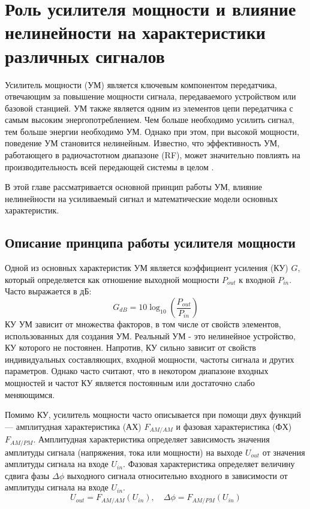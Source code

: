 \section{Роль усилителя мощности и влияние нелинейности
на характеристики различных сигналов}
Усилитель мощности (УМ) является ключевым компонентом передатчика,
отвечающим за повышение мощности сигнала, передаваемого устройством или
базовой станцией. УМ также является одним из элементов цепи передатчика с
самым высоким энергопотреблением. Чем больше необходимо усилить сигнал, тем
больше энергии необходимо УМ. Однако при этом, при высокой мощности,
поведение УМ становится нелинейным. Известно, что эффективность УМ,
работающего в радиочастотном диапазоне (RF), может значительно повлиять на
производительность всей передающей системы
в целом \cite{Lie2018}.

В этой главе рассматривается основной принцип работы УМ, влияние
нелинейности на усиливаемый сигнал и математические модели основных
характеристик.


\subsection{Описание принципа работы усилителя мощности}
Одной из основных характеристик УМ является коэффициент усиления (КУ) $G$,
который определяется как отношение выходной мощности $P_{out}$ к входной
$P_{in}$. Часто выражается в дБ:
\begin{equation}
    G_{dB} = 10\log_{10}\left(\frac{P_{out}}{P_{in}}\right)
\end{equation}
КУ УМ зависит от множества факторов, в том числе от свойств элементов,
использованных для создания УМ. Реальный УМ - это нелинейное устройство, КУ
которого не постоянен. Напротив, КУ сильно зависит от свойств
индивидуальных составляющих, входной мощности, частоты сигнала и других
параметров. Однако часто считают, что в некотором диапазоне входных
мощностей и частот КУ является постоянным или достаточно слабо
меняющимся.

Помимо КУ, усилитель мощности часто описывается при помощи двух функций —
амплитудная характеристика (АХ) $F_{AM/AM}$ и фазовая характеристика (ФХ)
$F_{AM/PM}$. Амплитудная характеристика определяет зависимость значения
амплитуды сигнала (напряжения, тока или мощности) на выходе $U_{out}$ от
значения амплитуды сигнала на входе $U_{in}$. Фазовая характеристика
определяет величину сдвига фазы $\Delta\phi$ выходного сигнала относительно
входного в зависимости от амплитуды сигнала на входе $U_{in}$.
\begin{equation}
    U_{out} = F_{AM/AM}(U_{in}), \quad \Delta\phi = F_{AM/PM}(U_{in})
\end{equation}

